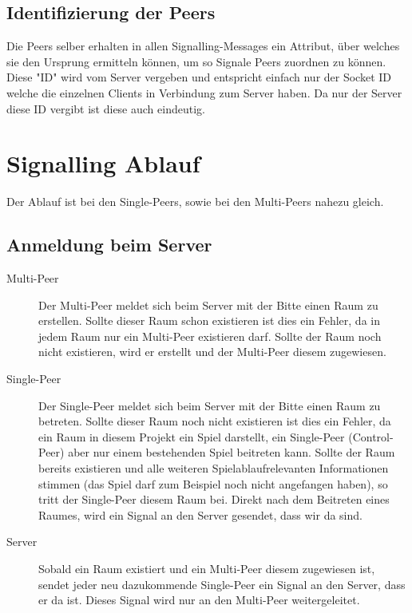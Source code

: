 \subsection{Identifizierung der Peers}
Die Peers selber erhalten in allen Signalling-Messages ein Attribut, über 
welches sie den Ursprung ermitteln können, um so Signale Peers zuordnen zu 
können. Diese "ID" wird vom Server vergeben und entspricht einfach nur der 
Socket ID welche die einzelnen Clients in Verbindung zum Server haben.
Da nur der Server diese ID vergibt ist diese auch eindeutig.



\section{Signalling Ablauf}
Der Ablauf ist bei den Single-Peers, sowie bei den Multi-Peers nahezu gleich.



\subsection{Anmeldung beim Server}
\begin{description}
\item[Multi-Peer]
Der Multi-Peer meldet sich beim Server mit der Bitte einen Raum zu erstellen. 
Sollte dieser Raum schon existieren ist dies ein Fehler, da in jedem Raum nur 
ein Multi-Peer existieren darf. Sollte der Raum noch nicht existieren, wird er 
erstellt und der Multi-Peer diesem zugewiesen.

\item[Single-Peer]
Der Single-Peer meldet sich beim Server mit der Bitte einen Raum zu betreten. 
Sollte dieser Raum noch nicht existieren ist dies ein Fehler, da ein Raum in 
diesem Projekt ein Spiel darstellt, ein Single-Peer (Control-Peer) aber nur 
einem bestehenden Spiel beitreten kann. Sollte der Raum bereits existieren und 
alle weiteren Spielablaufrelevanten Informationen stimmen (das Spiel darf zum 
Beispiel noch nicht angefangen haben), so tritt der Single-Peer diesem Raum bei. 
Direkt nach dem Beitreten eines Raumes, wird ein Signal an den Server gesendet, 
dass wir da sind.

\item[Server]
Sobald ein Raum existiert und ein Multi-Peer diesem zugewiesen ist, sendet jeder 
neu dazukommende Single-Peer ein Signal an den Server, dass er da ist. Dieses 
Signal wird nur an den Multi-Peer weitergeleitet.
\end{description}



